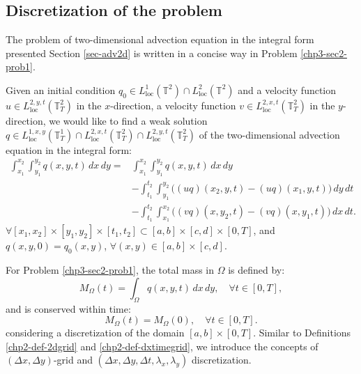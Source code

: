 \subsection{Discretization of the problem}
The problem of two-dimensional advection equation in the integral form 
presented Section \ref{sec-adv2d} is written in a concise way in Problem \ref{chp3-sec2-prob1}.
\begin{prob}
	\label{chp3-sec2-prob1}
	Given an initial condition ${q}_0\in {L}^{1}_{\text{loc}}(\mathbb{T}^2) \cap {L}^{2}_{\text{loc}}(\mathbb{T}^2)$ and
	a velocity function $u \in {L}^{2,y,t}_{\text{loc}}(\mathbb{T}^2_{T})$ in the $x$-direction, 
	a velocity function $v \in {L}^{2,x,t}_{\text{loc}}(\mathbb{T}^2_{T})$ in the $y$-direction, 
 	we would like to find a weak solution 
 	${q} \in {L}^{1,x,y}_{\text{loc}}(\mathbb{T}^1_{T}) \cap {L}^{2,x,t}_{\text{loc}}(\mathbb{T}^2_{T}) \cap {L}^{2,y,t}_{\text{loc}}(\mathbb{T}^2_{T})$
	of the two-dimensional advection equation in the integral form:
	\begin{align*}
		\int_{x_1}^{x_2} \int_{y_1}^{y_2}
		{q}(x, y, t) \,dx \,dy = &\int_{x_1}^{x_2} \int_{y_1}^{y_2}
		{q}(x, y, t) \,dx \,dy \\ \nonumber
		&-\int_{t_1}^{t_2} \int_{y_1}^{y_2} \bigg({(uq)}(x_2, y, t)
		-{(uq)}(x_1, y, t) \bigg) \,dy \,dt\\ \nonumber
		&-\int_{t_1}^{t_2} \int_{x_1}^{x_2} \bigg({(vq)}(x, y_2, t)
		-{(vq)}(x, y_1, t) \bigg) \,dx \,dt.
	\end{align*}
	$\forall [x_1, x_2]\times [y_1, y_2] \times[t_1, t_2] \subset [a,b] \times [c,d] \times[0,T]$, 
	and ${q}(x, y, 0) = {q}_0(x, y)$, $\forall (x, y) \in [a,b] \times [c,d]$.
\end{prob}
For Problem \ref{chp3-sec2-prob1}, the total mass in $\Omega$ is defined by: 
\begin{equation}
	{M}_{\Omega}(t) = \int_{\Omega} {q}(x,y,t) \,dx \,dy , \quad \forall t \in [0,T],
\end{equation}
and is conserved within time: 
\begin{equation}
	{M}_{\Omega}(t) = {M}_{\Omega}(0), \quad \forall t \in [0,T].
\end{equation}
considering a discretization of the domain $[a,b] \times [0,T]$. 
Similar to Definitions \ref{chp2-def-2dgrid} and \ref{chp2-def-dxtimegrid},
we introduce the concepts of $(\Delta x,\Delta y)$-grid and $(\Delta x, \Delta y,\Delta t, \lambda_x,\lambda_y)$ discretization.

